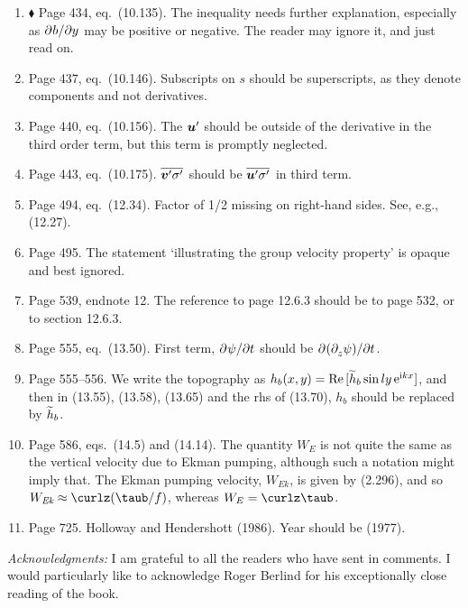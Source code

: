 \documentclass[10pt]{article}
\newcommand{\eq}{eq.\ } \newcommand{\Eq}{Eq.\ }
\renewcommand{\star}{\ensuremath{\blacklozenge} }
\begin{document}
\begin{enumerate}
\item \star Page 434, \eq (10.135). The inequality needs further explanation, especially as ${\partial^{} b / \partial y^{}} $ may be positive or negative.  The reader may ignore it, and just read on.

\item Page 437, \eq (10.146). Subscripts on $s$ should be superscripts, as they denote components and not derivatives. 

\item Page 440, \eq (10.156). The ${\bm {u}}'$ should be outside of the derivative in the third order term, but this term is promptly neglected. 

\item Page 443, \eq (10.175). $\overline{{\bm {v}}' \sigma'}^{}$ should be $\overline{{\bm {u}}' \sigma'}^{}$ in third term.

 \item Page 494, \eq (12.34). Factor of 1/2 missing on right-hand sides. See, e.g., (12.27). 

 \item Page 495. The statement `illustrating the group velocity property' is opaque and best ignored. 

 \item Page 539, endnote 12. The reference to page 12.6.3 should be to page 532, or to section 12.6.3.
 
 \item Page 555, \eq (13.50). First term, ${\partial^{} \psi / \partial t^{}}$ should be ${\partial^{}  ({\partial^{}_{z} \psi }) / \partial t^{}}$.  
 
 \item Page 555--556. We write the topography as $h_b(x,y)= \text{Re}\, [ \widetilde{h}_b \sin ly \, \mathrm{e}^{\mathrm{i} kx} ]$, and then in (13.55), (13.58), (13.65) and the rhs of (13.70), $h_b$ should be replaced by $\widetilde h_b$.

 \item Page 586, eqs.\ (14.5) and (14.14). The quantity $W_E$ is not quite the same as the vertical velocity due to Ekman pumping, although such a notation might imply that. The Ekman pumping velocity, $W_\textit{Ek}$, is given by (2.296), and so $W_\textit{Ek} \approx \curlz (\taub/f)$, whereas $W_E = \curlz \taub$.  
 
 \item Page 725. Holloway and Hendershott (1986). Year should be (1977).

\end{enumerate}

\noindent \textit{Acknowledgments:} I am grateful to all the readers who have sent in comments. I would particularly like to acknowledge Roger Berlind for his exceptionally close reading of the book.
\end{document}

